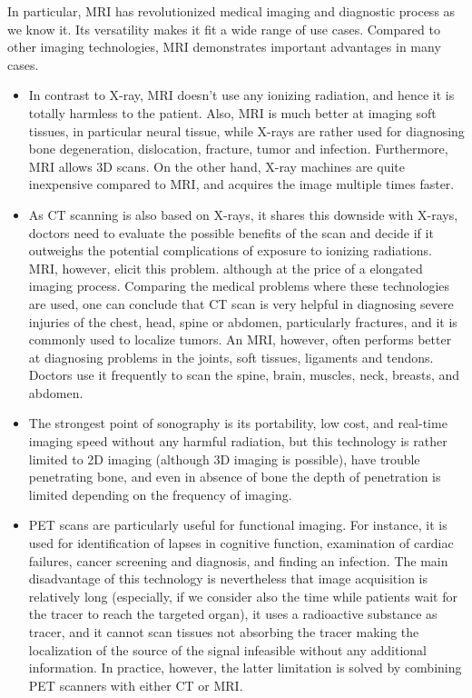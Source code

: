 In particular, MRI has revolutionized medical imaging and diagnostic process as we know it. Its versatility makes it fit a wide range of use cases. Compared to other imaging technologies, MRI demonstrates important advantages in many cases.
\begin{itemize}
    \item In contrast to X-ray, MRI doesn't use any ionizing radiation, and hence it is totally harmless to the patient. Also, MRI is much better at imaging soft tissues, in particular neural tissue,  while X-rays are rather used for diagnosing bone degeneration, dislocation, fracture, tumor and infection. Furthermore, MRI allows 3D scans. On the other hand, X-ray machines are quite inexpensive compared to MRI, and acquires the image multiple times faster.
    \item As CT scanning is also based on X-rays, it shares this downside with X-rays, doctors need to evaluate the possible benefits of the scan and decide if it outweighs the potential complications of exposure to ionizing radiations. MRI, however, elicit this problem. although at the price of a elongated imaging process. Comparing the medical problems where these technologies are used, one can conclude that CT scan is very helpful in diagnosing severe injuries of the chest, head, spine or abdomen, particularly fractures, and it is commonly used to localize tumors. An MRI, however, often performs better at diagnosing problems in the joints, soft tissues, ligaments and tendons. Doctors use it frequently to scan the spine, brain, muscles, neck, breasts, and abdomen.
    \item The strongest point of sonography is its portability, low cost, and real-time imaging speed without any harmful radiation, but this technology is rather limited to 2D imaging (although 3D imaging is possible), have trouble penetrating bone, and even in absence of bone the depth of penetration is limited depending on the frequency of imaging.
    \item PET scans are particularly useful for functional imaging. For instance, it is used for identification of lapses in cognitive function, examination of cardiac failures, cancer screening and diagnosis, and finding an infection. The main disadvantage of this technology is nevertheless that image acquisition is relatively long (especially, if we consider also the time while patients wait for the tracer to reach the targeted organ), it uses a radioactive substance as tracer, and it cannot scan tissues not absorbing the tracer making the localization of the source of the signal infeasible without any additional information. In practice, however, the latter limitation is solved by combining PET scanners with either CT or MRI.
\end{itemize}
